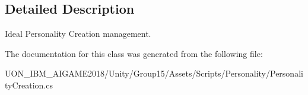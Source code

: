 \subsection{Detailed Description}
Ideal Personality Creation management. 

The documentation for this class was generated from the following file\+:\begin{DoxyCompactItemize}
\item 
U\+O\+N\+\_\+\+I\+B\+M\+\_\+\+A\+I\+G\+A\+M\+E2018/\+Unity/\+Group15/\+Assets/\+Scripts/\+Personality/Personality\+Creation.\+cs\end{DoxyCompactItemize}
